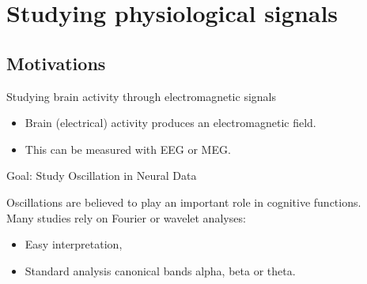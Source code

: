 \documentclass[prez_parietal.tex]{subfiles}
\begin{document}
\section{Studying physiological signals}
\subsection{Motivations}

\begin{frame}{Studying brain activity through electromagnetic signals}
\begin{itemize}
    \item Brain (electrical) activity produces an electromagnetic field.
    \item This can be measured with EEG or MEG.
\end{itemize}

\end{frame}

\begin{frame}{Goal: Study Oscillation in Neural Data}

\textbf{}Oscillations are believed to play an important role in cognitive functions.\\[3em]
Many studies rely on Fourier or wavelet analyses:\\[.5em]
\begin{itemize}\itemsep1em
\item Easy interpretation,
\item Standard analysis \eg{} canonical bands alpha, beta or theta.\\
\end{itemize}

\end{frame}

\end{document}
